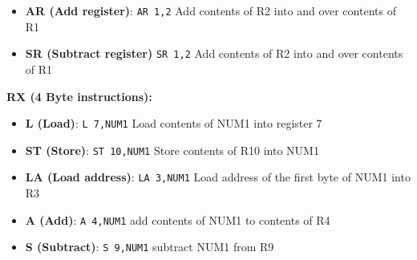 \documentclass{report}
\begin{document}
\begin{itemize}
\begin{itemize}
                        \item \textbf{AR (Add register)}: \texttt{AR 1,2} Add contents of R2 into and over contents of R1
                        \item \textbf{SR (Subtract register)} \texttt{SR 1,2} Add contents of R2 into and over contents of R1
                    \end{itemize}
                    \bigbreak \noindent 
                    \textbf{RX (4 Byte instructions):}
                    \begin{itemize}
                        \item \textbf{L (Load)}: \texttt{L 7,NUM1} Load contents of NUM1 into register 7
                        \item \textbf{ST (Store)}: \texttt{ST 10,NUM1} Store contents of R10 into NUM1
                        \item \textbf{LA (Load address)}: \texttt{LA 3,NUM1} Load address of the first byte of NUM1 into R3
                        \item \textbf{A (Add)}: \texttt{A 4,NUM1} add contents of NUM1 to contents of R4
                        \item \textbf{S (Subtract)}: \texttt{S 9,NUM1} subtract NUM1 from R9
                    \end{itemize}
                    

\end{itemize}
\end{document}
